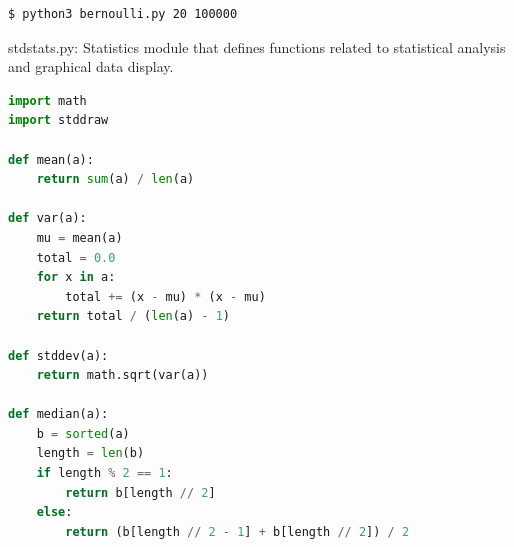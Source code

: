 \documentclass[8pt,a4paper,compress]{beamer}
\begin{document}
\begin{frame}[fragile]
\pause

\begin{minipage}{160pt}
\begin{lstlisting}[language={},style=focusin]
$ python3 bernoulli.py 20 100000
\end{lstlisting}
\end{minipage}%
\begin{minipage}{140pt}
\hfill {}
\end{minipage}
\end{frame}

\begin{frame}[fragile]
\pause

\begin{framed}
\tiny stdstats.py: Statistics module that defines functions related to statistical analysis and graphical data display.
\end{framed}

\begin{lstlisting}[language=Python,style=focusin]
import math
import stddraw

def mean(a):
    return sum(a) / len(a)

def var(a):
    mu = mean(a)
    total = 0.0
    for x in a:
        total += (x - mu) * (x - mu)
    return total / (len(a) - 1)

def stddev(a):
    return math.sqrt(var(a))

def median(a):
    b = sorted(a)
    length = len(b)
    if length % 2 == 1:
        return b[length // 2]
    else:
        return (b[length // 2 - 1] + b[length // 2]) / 2
\end{lstlisting}
\end{frame}
\end{document}
